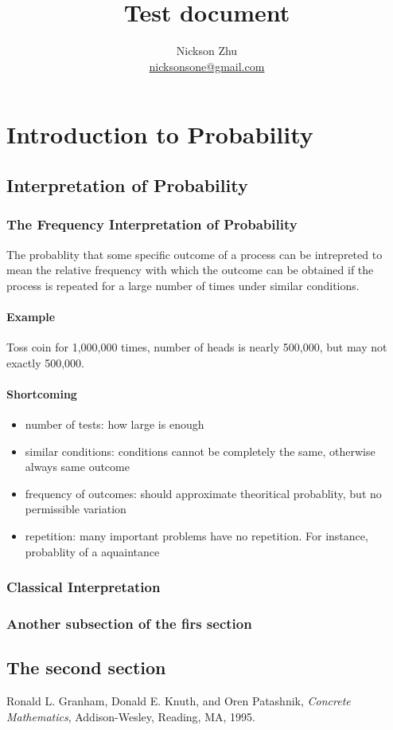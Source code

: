 \documentclass{book}
\title{Test document }
\author{Nickson Zhu  \\  \url{nicksonsone@gmail.com}}
\begin{document}
\maketitle
\tableofcontents
\newpage

\chapter{Introduction to Probability}
\section{Interpretation of Probability}
	\subsection{The Frequency Interpretation of Probability}

The probablity that some specific outcome of a process can be intrepreted to 
mean the relative frequency with which the outcome can be obtained if the 
process is repeated for a large number of times under similar conditions.  

\subsubsection{Example}
Toss coin for 1,000,000 times, number of heads is nearly 500,000, but may 
not exactly 500,000.

\subsubsection{Shortcoming} 
\begin{itemize}
\item number of tests: how large is enough 
\item similar conditions: conditions cannot be completely the same, otherwise always same outcome
\item frequency of outcomes: should approximate theoritical probablity, but no permissible variation
\item repetition: many important problems have no repetition. For instance, probablity of a aquaintance 
\end{itemize}

\subsection{Classical Interpretation}
\newpage

\subsection{Another subsection of the firs section}

\section{The second section}


\begin{thebibliography}{9}
		Ronald L.   Granham, Donald E.  Knuth, and Oren Patashnik,
		\textit{Concrete Mathematics},
		Addison-Wesley, Reading, MA, 1995.
	\end{thebibliography}
\end{document}
